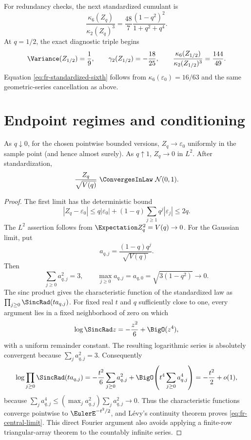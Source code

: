 For redundancy checks, the next standardized cumulant is
\begin{equation}
 \frac{\kappa_6(Z_q)}{\kappa_2(Z_q)^3}
 =\frac{48}{7}\frac{(1-q^2)^2}{1+q^2+q^4}.
 \label{eq:fr-standardized-sixth}
\end{equation}
At \(q=1/2\), the exact diagnostic triple begins
\[
 \Variance(Z_{1/2})=\frac19,
 \qquad\gamma_2(Z_{1/2})=-\frac{18}{25},
 \qquad\frac{\kappa_6(Z_{1/2})}{\kappa_2(Z_{1/2})^3}=\frac{144}{49}.
\]
Equation \cref{eq:fr-standardized-sixth} follows from
\(\kappa_6(\varepsilon_0)=16/63\) and the same geometric-series cancellation
as above.

\section{Endpoint regimes and conditioning}
\label{sec:fr-endpoints}

\begin{proposition}
\label{prop:fr-endpoint-laws}
As \(q\downarrow0\), for the chosen pointwise bounded versions,
\(Z_q\to\varepsilon_0\) uniformly in the sample point (and hence almost surely).
As \(q\uparrow1\), \(Z_q\to0\) in \(L^2\).  After standardization,
\begin{equation}
 \frac{Z_q}{\sqrt{V(q)}}\ \ConvergesInLaw\ \mathcal N(0,1).
 \label{eq:fr-central-limit}
\end{equation}
\end{proposition}

\begin{proof}
The first limit has the deterministic bound
\[
 |Z_q-\varepsilon_0|
 \le q|\varepsilon_0|+(1-q)\sum_{j\ge1}q^j|\varepsilon_j|\le2q.
\]
The \(L^2\) assertion follows from
\(\Expectation Z_q^2=V(q)\to0\).  For the Gaussian limit, put
\[
 a_{q,j}=\frac{(1-q)q^j}{\sqrt{V(q)}}.
\]
Then
\[
 \sum_{j\ge0}a_{q,j}^2=3,
 \qquad \max_{j\ge0}a_{q,j}=a_{q,0}
 =\sqrt{3(1-q^2)}\longrightarrow0.
\]
The sinc product gives the characteristic function of the standardized law as
\(\prod_{j\ge0}\SincRad(t a_{q,j})\).  For fixed real \(t\) and \(q\) sufficiently
close to one, every argument lies in a fixed neighborhood of zero on which
\[
 \log\SincRad z=-\frac{z^2}{6}+\BigO(z^4),
\]
with a uniform remainder constant.  The resulting logarithmic series is
absolutely convergent because \(\sum_j a_{q,j}^2=3\).  Consequently
\[
 \log\prod_{j\ge0}\SincRad(t a_{q,j})
 =-\frac{t^2}{6}\sum_{j\ge0}a_{q,j}^2
  +\BigO\!\left(t^4\sum_{j\ge0}a_{q,j}^4\right)
 =-\frac{t^2}{2}+o(1),
\]
because
\(\sum_j a_{q,j}^4\le(\max_j a_{q,j}^2)\sum_j a_{q,j}^2\to0\).
Thus the characteristic functions converge pointwise to \(\EulerE^{-t^2/2}\),
and L\'evy's continuity theorem proves \cref{eq:fr-central-limit}.  This direct
Fourier argument also avoids applying a finite-row triangular-array theorem to
the countably infinite series.
\end{proof}

